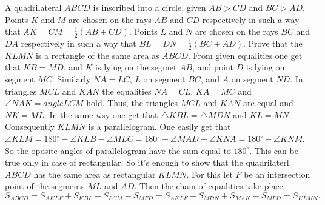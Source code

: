 \problem
A quadrilateral $ABCD$ is inscribed into a circle, given $AB > CD$ and $BC > AD$.
Points $K$ and $M$ are chosen on the rays $AB$ and $CD$ respectively in such a
way that $AK = CM = \frac{1}{2} (AB + CD)$.
Points $L$ and $N$ are chosen on the rays $BC$ and $DA$ respectively in such a
way that $BL = DN = \frac{1}{2} (BC + AD)$.
Prove that the $KLMN$ is a rectangle of the same area as $ABCD$.
\solution 
From given equalities one get that $KB=MD$, and $K$ is lying on the segmet $AB$,
and point $D$ is lying on segment $MC$. Similarly $NA=LC$, $L$ on segment $BC$, and $A$ on segment $ND$. In triangles $MCL$ and $KAN$ the equalities $NA=CL$, $KA=MC$ and $\angle NAK=angle LCM$ hold. Thus, the triangles $MCL$ and $KAN$ are equal and $NK=ML$.
In the same wsy one get that $\triangle KBL=\triangle MDN$ and $KL=MN$. Consequently $KLMN$ is a parallelogram. One easily get that $\angle KLM=180^\circ-\angle KLB-\angle MLC=180^\circ-\angle MAD-\angle KNA=180^\circ-\angle KNM$. So the oposite angles of parallelogram have the sum equal to $180^\circ$. This can be true only in case of rectangular. So it's enough to show that the quadrilaterl $ABCD$ has the same area as rectangular $KLMN$. For this let $F$  be an intersection point of the segments $ML$ and $AD$. Then the chain of equalities take place 
\[
S_{ABCD}=S_{AKLF}+S_{KBL}+S_{LCM}-S_{MFD}=S_{AKLF}+S_{MDN}+S_{MAK}-S_{MFD}=S_{KLMN}.
\]
\endproblem
